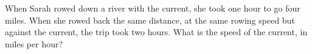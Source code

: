 When Sarah rowed down a river with the current, she took one hour to go four miles. When she rowed back the same distance, at the same rowing speed but against the current, the trip took two hours. What is the speed of the current, in miles per hour?
